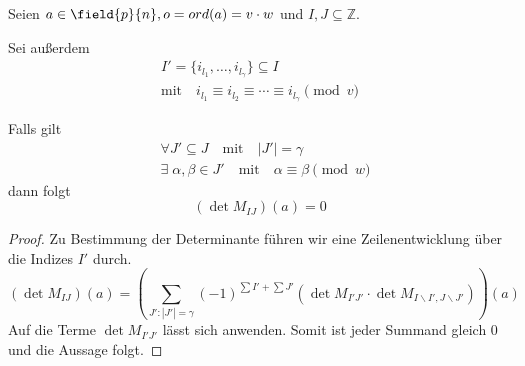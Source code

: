 \begin{satz}
    Seien $a \in \field{p}{n}, o = ord(a) = v\cdot w$ und $I,J \subseteq \mathbb{Z}$.
    
    Sei außerdem 
    \begin{gather*}
        I' = \{i_{l_1},\dots,i_{l_\gamma}\} \subseteq I \\
        \text{mit} \quad i_{l_1} \equiv i_{l_2} \equiv \cdots \equiv i_{l_\gamma} \pmod v
    \end{gather*}
    
    Falls gilt 
    \begin{align*}
        & \forall J' \subseteq J \quad \text{mit} \quad |J'|= \gamma \\ 
        & \exists \; \alpha,\beta \in J' \quad \text{mit} \quad \alpha \equiv \beta \pmod w
    \end{align*}
    dann folgt
    \begin{equation*}
        (\det M_{IJ})(a) = 0
    \end{equation*}
\end{satz}

\begin{proof}
    Zu Bestimmung der Determinante führen wir eine Zeilenentwicklung über die Indizes $I'$ durch. 
\begin{equation*}
    (\det M_{IJ})(a) = \left( \sum_{J':|J'| = \gamma} (-1)^{\sum I' + \sum J'} \left( \det M_{I'J'} \cdot \det M_{I\backslash I',J\backslash J'} \right) \right)(a)
\end{equation*}
Auf die Terme $\det M_{I'J'}$ lässt sich  anwenden. Somit ist jeder Summand gleich $0$ und die Aussage folgt.
\end{proof}